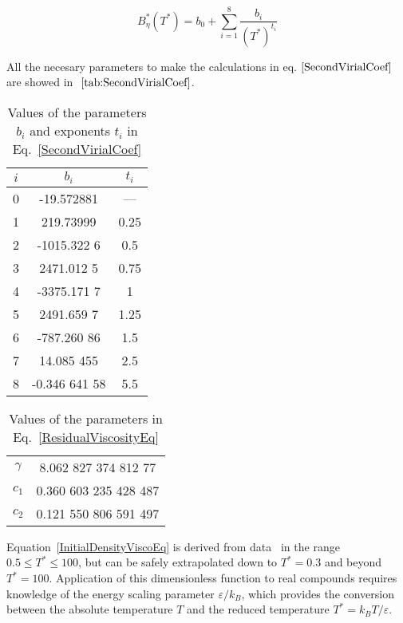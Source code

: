 \begin{equation}
    B^*_\eta(T^*)=b_0+\sum^8_{i=1}\frac{b_i}{(T^*)^{t_i}}
	\label{SecondVirialCoef}
\end{equation}

All the necesary parameters to make the calculations in
eq.$~\ref{SecondVirialCoef}$ are showed in $~\ref{tab:SecondVirialCoef}$.

\begin{table}[ht]
    \centering
    \begin{tabular}{c|c|c}
    $i$&$b_i$&$t_i$\\
    \hline
    0   & -19.572881    &—\\  
    1   & 219.73999     &0.25\\       
    2   & -1015.322 6   &0.5 \\   
    3   & 2471.012 5    &0.75\\   
    4   & -3375.171 7   &1  \\
    5   & 2491.659 7    &1.25\\   
    6   & -787.260 86   &1.5 \\   
    7   & 14.085 455    &2.5 \\   
    8   & -0.346 641 58 &5.5\\
    \end{tabular}
    \caption{Values of the parameters $b_i$ and exponents $t_i$ in
    Eq.~\ref{SecondVirialCoef}}
    \label{tab:SecondVirialCoef}
\end{table}

\begin{table}[ht]
    \centering
    \begin{tabular}{c c}
    \hline
    \hline
    $\gamma$   & 8.062 827 374 812 77    \\  
    $c_1$ & 0.360 603 235 428 487    \\       
    $c_2$   & 0.121 550 806 591 497   \\
    \hline
    \end{tabular}
    \caption{Values of the parameters in Eq.~\ref{ResidualViscosityEq}}
    \label{tab:my_label3}
\end{table}

Equation~\ref{InitialDensityViscoEq} is derived from
data~\cite{vogel1998reference} in the range $0.5 \leq T^{*} \leq 100$, but can
be safely extrapolated down to $T^{*} = 0.3$ and beyond $T^{*} = 100$.
Application of this dimensionless function to real compounds requires knowledge
of the energy scaling parameter $\varepsilon / k_{B}$, which provides the
conversion between the absolute temperature $T$ and the reduced temperature
$T^{*} = k_{B} T / \varepsilon$.


